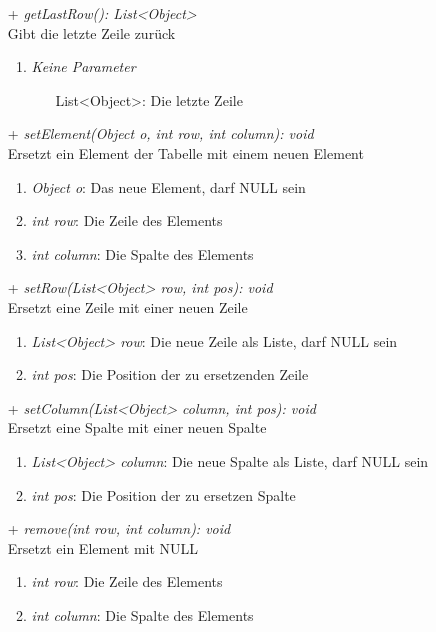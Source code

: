 \begin{itemize}
	\item[+] \textit{getLastRow(): List<Object>} \\
	Gibt die letzte Zeile zurück
		\begin{enumerate}
			\item \textit{Keine Parameter}
			\begin{itemize}
				\item[] List<Object>: Die letzte Zeile
			\end{itemize}
		\end{enumerate}
	
	\item[+] \textit{setElement(Object o, int row, int column): void} \\
	Ersetzt ein Element der Tabelle mit einem neuen Element
	\begin{enumerate}
		\item \textit{Object o}: Das neue Element, darf NULL sein
		\item \textit{int row}: Die Zeile des Elements
		\item \textit{int column}: Die Spalte des Elements
	\end{enumerate}

	\item[+] \textit{setRow(List<Object> row, int pos): void} \\
	Ersetzt eine Zeile mit einer neuen Zeile
	\begin{enumerate}
		\item \textit{List<Object> row}: Die neue Zeile als Liste, darf NULL sein
		\item \textit{int pos}: Die Position der zu ersetzenden Zeile
	\end{enumerate}

	\item[+] \textit{setColumn(List<Object> column, int pos): void} \\
	Ersetzt eine Spalte mit einer neuen Spalte
	\begin{enumerate}
		\item \textit{List<Object> column}: Die neue Spalte als Liste, darf NULL sein
		\item \textit{int pos}: Die Position der zu ersetzen Spalte
	\end{enumerate}

	\item[+] \textit{remove(int row, int column): void} \\
	Ersetzt ein Element mit NULL
	\begin{enumerate}
		\item \textit{int row}: Die Zeile des Elements
		\item \textit{int column}: Die Spalte des Elements
	\end{enumerate}


\end{itemize}
